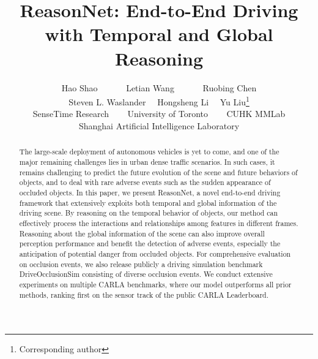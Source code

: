 \documentclass[10pt,twocolumn,letterpaper]{article}
\begin{document}
\title{ReasonNet: End-to-End Driving with Temporal and Global Reasoning}

\author{Hao Shao~~~~~~ Letian Wang~~~~~~ Ruobing Chen \\ \vspace{0.5em}Steven L. Waslander~~ Hongsheng Li~~ Yu Liu\thanks{Corresponding author}\\ 
SenseTime Research ~~~ University of Toronto ~~~  CUHK MMLab \\   Shanghai Artificial Intelligence Laboratory
}



\maketitle

\begin{abstract}
The large-scale deployment of autonomous vehicles is yet to come, and one of the major remaining challenges lies in urban dense traffic scenarios. In such cases, it remains challenging to predict the future evolution of the scene and future behaviors of objects, and to deal with rare adverse events such as the sudden appearance of occluded objects. In this paper, we present ReasonNet, a novel end-to-end driving framework that extensively exploits both temporal and global information of the driving scene. By reasoning on the temporal behavior of objects, our method can effectively process the interactions and relationships among features in different frames. Reasoning about the global information of the scene can also improve overall perception performance and benefit the detection of adverse events, especially the anticipation of potential danger from occluded objects. For comprehensive evaluation on occlusion events, we also release publicly a driving simulation benchmark DriveOcclusionSim consisting of diverse occlusion events. We conduct extensive experiments on multiple CARLA benchmarks, where our model outperforms all prior methods, ranking first on the sensor track of the public CARLA Leaderboard\cite{leaderboard}.
\end{abstract}
\end{document}
